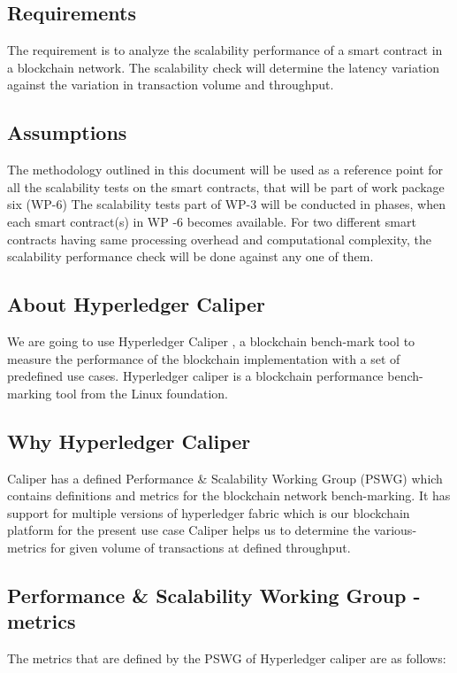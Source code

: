 \documentclass{ceadar_article}
\begin{document}
\subsection{Requirements}
The requirement is to analyze the scalability performance of a smart contract in a blockchain network. The scalability check will determine the latency variation against the variation in transaction volume and throughput.


\subsection{Assumptions}
The methodology outlined in this document will be used as a reference point for all the scalability tests on the smart contracts, that will be part of work package six (WP-6)
\newline
The scalability tests part of WP-3 will be conducted in phases, when each smart contract(s) in WP -6 becomes available. 
\newline
For two different smart contracts having same processing overhead and computational complexity, the scalability performance check will be done against any one of them.


\subsection{About Hyperledger Caliper}
We are going to use Hyperledger Caliper \cite{hyperledgerCaliper}, a blockchain bench-mark tool to measure the performance of the blockchain implementation with a set of predefined use cases. \newline
Hyperledger caliper is a blockchain performance bench-marking tool from the Linux foundation. 

\subsection{Why Hyperledger Caliper}
Caliper has a defined Performance \& Scalability Working Group (PSWG) \cite{pswg} which contains definitions and metrics for the blockchain network bench-marking. \newline
It has support for multiple versions of hyperledger fabric which is our blockchain platform for the present use case\newline
Caliper helps us to determine the various-metrics for given volume of transactions at defined throughput.

\subsection {Performance \& Scalability Working Group - metrics}
The metrics that are defined by the PSWG of Hyperledger caliper are as follows:
\end{document}
